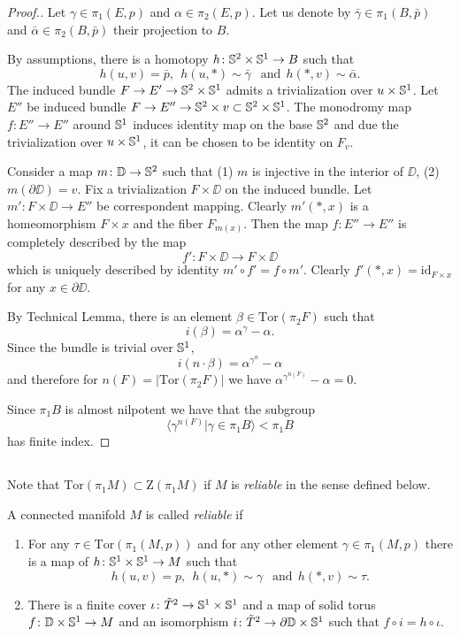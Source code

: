 \documentclass{amsart}
\begin{document}
\begin{proof}[Proof.] 
Let $\gamma\in \pi_1(E,p)$ and $\alpha\in \pi_2(E,p)$. 
Let us denote by $\bar\gamma\in \pi_1(B,\bar p)$ and 
$\bar\alpha\in \pi_2(B,\bar p)$ their projection to $B$.

By assumptions, there is a homotopy 
$h\colon {\Bbb S}^2\times {\Bbb S}^1\to B$ such that 
$$h(u,v)=\bar p,\ \ 
h(u,*)\sim\bar\gamma\ \ \text{ and}\ \ 
h(*,v)\sim\bar\alpha.$$
The induced bundle $F\to E'\to {\Bbb S}^2\times {\Bbb S}^1$ admits a 
trivialization over $u\times {\Bbb S}^1$.
Let $E''$ be induced bundle $F\to E''\to {\Bbb S}^2\times v\subset {\Bbb S}^2\times {\Bbb S}^1$.
The  monodromy map $f\colon E''\to E''$ around ${\Bbb S}^1$
induces identity map on the base ${\Bbb S}^2$ 
and due the trivialization over $u\times {\Bbb S}^1$,
it  can be chosen to be identity on $F_v$.

Consider a map $m\colon \mathbb{D}\to {\Bbb S}^2$ such that 
(1) $m$ is injective in the interior of $\DD$, 
(2) $m(\partial \DD)=v$.
Fix a trivialization 
$F\times \DD$ on the induced bundle. 
Let 
$m'\colon F\times \DD\to E''$ be correspondent mapping. 
Clearly 
$m'(*,x)$ is a homeomorphism $F\times x$ and the fiber $F_{m(x)}$.
Then the map $f\colon E''\to E''$ is completely described by the map 
$$f'\colon F\times \DD\to F\times \DD$$ 
which is uniquely described by identity $m'\circ f'=f\circ m'$. 
Clearly $f'(*,x)=\mathrm{id}_{F\times x}$ 
for any $x\in\partial \DD$.

By Technical Lemma, there is an element 
$\beta\in \mathrm{Tor}(\pi_2F)$ such that 
\[i(\beta)=\alpha^\gamma-\alpha.\]
Since the bundle is trivial over ${\Bbb S}^1$,
\[i(n\cdot \beta)=\alpha^{\gamma^n}-\alpha\] and therefore for $n(F)=|\mathrm{Tor}(\pi_2F)|$ we have 
$\alpha^{\gamma^{n(F)}}-\alpha=0$. 

Since $\pi_1B$ is almost nilpotent we have that the subgroup  \[\langle\gamma^{n(F)}|\gamma\in \pi_1B\rangle<\pi_1B\] 
has finite index.
\end{proof}



\subsection{}
Note that $\mathrm{Tor}(\pi_1M)\subset \mathrm{Z}(\pi_1M)$ if $M$ is \emph{reliable} in the sense defined below.


\begin{defn}
A connected manifold $M$ is called {\it reliable} if 
\begin{enumerate}
\item For any 
$\tau\in \mathrm{Tor}(\pi_1(M,p))$ and for any other element $\gamma\in \pi_1(M,p)$ there is a map of $h\colon {\Bbb S}^1\times {\Bbb S}^1\to M$  such that 
$$h(u,v)= p,\ \ 
h(u,*)\sim\gamma\ \ \text{ and}\ \ 
h(*,v)\sim\tau.$$
\item There is a finite cover $\iota\colon \tilde T^2\z\to {\Bbb S}^1\times {\Bbb S}^1$ and a map of solid torus $f\colon \DD\times {\Bbb S}^1\z\to M$ and an isomorphism $i\colon \tilde T^2\to \partial \mathbb{D}\times {\Bbb S}^1$ such that $f\circ i=h\circ\iota$.
\end{enumerate}

\end{defn}
\end{document}

